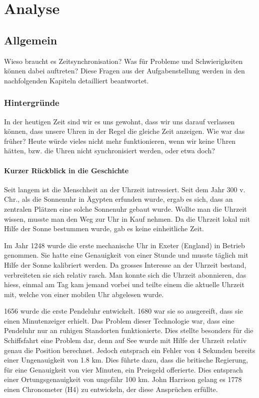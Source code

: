 
\chapter{Analyse}

\section{Allgemein}
Wieso braucht es Zeitsynchronisation? Was für Probleme und Schwierigkeiten können dabei auftreten? Diese Fragen aus der Aufgabenstellung werden in den nachfolgenden Kapiteln detailliert beantwortet.

\subsection{Hintergründe} \label{Analyse:Hintergruende}
In der heutigen Zeit sind wir es uns gewohnt, dass wir uns darauf verlassen können, dass unsere Uhren in der Regel die gleiche Zeit anzeigen. 
Wie war das früher? Heute würde vieles nicht mehr funktionieren, wenn wir keine Uhren hätten, bzw. die Uhren nicht synchronisiert werden, oder etwa doch?

\subsubsection{Kurzer Rückblick in die Geschichte}
Seit langem ist die Menschheit an der Uhrzeit intressiert.
Seit dem Jahr 300 v. Chr., als die Sonnenuhr in Ägypten erfunden wurde, ergab es sich, dass an zentralen Plätzen eine solche Sonnenuhr gebaut wurde. Wollte man die Uhrzeit wissen, musste man den Weg zur Uhr in Kauf nehmen.
Da die Uhrzeit lokal mit Hilfe der Sonne bestummen wurde, gab es keine einheitliche Zeit.

Im Jahr 1248 wurde die erste mechanische Uhr in Exeter (England) in Betrieb genommen. Sie hatte eine Genauigkeit von einer Stunde und musste täglich mit Hilfe der Sonne kalibriert werden.
Da grosses Interesse an der Uhrzeit bestand, verbreiteten sie sich relativ rasch.
Man konnte sich die Uhrzeit abonnieren, das hiess, einmal am Tag kam jemand vorbei und teilte einem die aktuelle Uhrzeit mit, welche von einer mobilen Uhr abgelesen wurde.

1656 wurde die erste Pendeluhr entwickelt. 1680 war sie so ausgereift, dass sie einen Minutenzeiger erhielt. Das Problem dieser Technologie war, dass eine Pendeluhr nur an ruhigen Standorten funktionierte.
Dies stellte besonders für die Schiffsfahrt eine Problem dar, denn auf See wurde mit Hilfe der Uhrzeit relativ genau die Position berechnet. Jedoch entsprach ein Fehler von 4 Sekunden bereits einer Ungenauigkeit  von 1.8 km.
Dies führte dazu, dass die britische Regierung, für eine Genauigkeit von vier Minuten, ein Preisgeld offerierte. Dies entsprach einer Ortungsgenauigkeit von ungefähr 100 km.
John Harrison gelang es 1778 einen Chronometer (H4) zu entwickeln, der diese Ansprüchen erfüllte.


